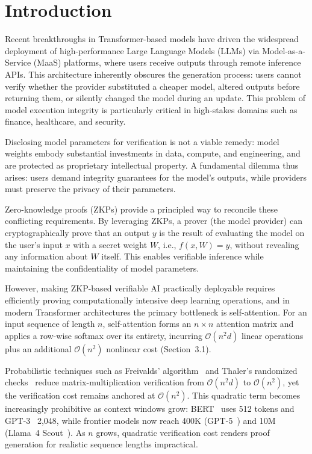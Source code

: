\documentclass[runningheads]{llncs}
\begin{document}
\section{Introduction}
Recent breakthroughs in Transformer-based models have driven the widespread deployment of high-performance Large Language Models (LLMs) via Model-as-a-Service (MaaS) platforms, where users receive outputs through remote inference APIs. This architecture inherently obscures the generation process: users cannot verify whether the provider substituted a cheaper model, altered outputs before returning them, or silently changed the model during an update. This problem of model execution integrity is particularly critical in high-stakes domains such as finance, healthcare, and security.

Disclosing model parameters for verification is not a viable remedy: model weights embody substantial investments in data, compute, and engineering, and are protected as proprietary intellectual property. A fundamental dilemma thus arises: users demand integrity guarantees for the model's outputs, while providers must preserve the privacy of their parameters.

Zero-knowledge proofs (ZKPs) provide a principled way to reconcile these conflicting requirements. By leveraging ZKPs, a prover (the model provider) can cryptographically prove that an output $y$ is the result of evaluating the model on the user's input $x$ with a secret weight $W$, i.e., $f(x, W) = y$, without revealing any information about $W$ itself. This enables verifiable inference while maintaining the confidentiality of model parameters.

However, making ZKP-based verifiable AI practically deployable requires efficiently proving computationally intensive deep learning operations, and in modern Transformer architectures the primary bottleneck is self-attention. For an input sequence of length $n$, self-attention forms an $n \times n$ attention matrix and applies a row-wise softmax over its entirety, incurring $\mathcal{O}(n^2 d)$ linear operations plus an additional $\mathcal{O}(n^2)$ nonlinear cost (Section~3.1).

Probabilistic techniques such as Freivalds' algorithm~\cite{Freivalds} and Thaler's randomized checks~\cite{Thaler} reduce matrix-multiplication verification from $\mathcal{O}(n^2 d)$ to $\mathcal{O}(n^2)$, yet the verification cost remains anchored at $\mathcal{O}(n^2)$. This quadratic term becomes increasingly prohibitive as context windows grow: BERT~\cite{BERT} uses 512 tokens and GPT-3~\cite{GPT3} 2,048, while frontier models now reach 400K (GPT-5~\cite{GPT5}) and 10M (Llama~4 Scout~\cite{llama4}). As $n$ grows, quadratic verification cost renders proof generation for realistic sequence lengths impractical.
\end{document}
